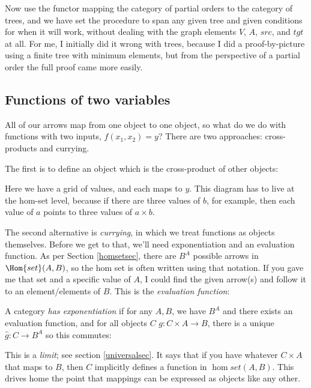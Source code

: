 \documentclass[11pt]{article}
\begin{document}
Now use the functor mapping the category of partial orders to the category of trees,
and we have set the procedure to span any given tree and given conditions for when it will work,
without dealing with the graph elements $V$, $A$, $src$, and $tgt$ at all.
For me, I initially did it wrong with trees, because I did a proof-by-picture using
a finite tree with minimum elements, but from the perspective of a partial order the
full proof came more easily.

\subsection{Functions of two variables} All of our arrows map from one object to one
object, so what do we do with functions with two inputs, $f(x_1, x_2)=y$? There are two
approaches: cross-products and currying.

The first is to define an object which is the cross-product of other objects:


Here we have a grid of values, and each maps to $y$.
This diagram has to live at the hom-set level, because if there are three values of $b$,
for example, then each value of $a$ points to three values of $a\times b$.

The second alternative is {\em currying}, in which we treat functions as objects
themselves. Before we get to that, we'll need exponentiation and an evaluation function.
As per Section \ref{homsetsec}, there are $B^A$ possible arrows in $\Hom{set}(A, B)$, so
the hom set is often written using that notation. If you gave me that set and a specific
value of $A$, I could find the given arrow(s) and follow it to an element/elements of $B$.
This is the {\em evaluation function}:

A category {\em has exponentiation} if for any $A, B$, we have $B^A$ and there exists
an evaluation function, and for all objects $C$ 
$g:C\times A \to B$, there is a unique $\hat g:C\to B^A$ so this commutes:


This is a {\em limit}; see section \ref{universalsec}. It
says that if you have whatever $C\times A$ that maps to $B$, then $C$ implicitly defines a
function in $\hom{set}(A,B)$. This drives home the point that mappings can be expressed as
objects like any other.
\end{document}
